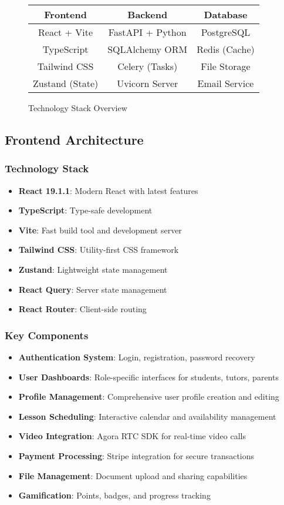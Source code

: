 \documentclass[11pt,a4paper]{article}
\begin{document}
\begin{figure}[h]
\centering
\begin{tabular}{|c|c|c|}
\hline
\textbf{Frontend} & \textbf{Backend} & \textbf{Database} \\
\hline
React + Vite & FastAPI + Python & PostgreSQL \\
TypeScript & SQLAlchemy ORM & Redis (Cache) \\
Tailwind CSS & Celery (Tasks) & File Storage \\
Zustand (State) & Uvicorn Server & Email Service \\
\hline
\end{tabular}
\caption{Technology Stack Overview}
\end{figure}

\subsection{Frontend Architecture}

\subsubsection{Technology Stack}
\begin{itemize}
    \item \textbf{React 19.1.1}: Modern React with latest features
    \item \textbf{TypeScript}: Type-safe development
    \item \textbf{Vite}: Fast build tool and development server
    \item \textbf{Tailwind CSS}: Utility-first CSS framework
    \item \textbf{Zustand}: Lightweight state management
    \item \textbf{React Query}: Server state management
    \item \textbf{React Router}: Client-side routing
\end{itemize}

\subsubsection{Key Components}
\begin{itemize}
    \item \textbf{Authentication System}: Login, registration, password recovery
    \item \textbf{User Dashboards}: Role-specific interfaces for students, tutors, parents
    \item \textbf{Profile Management}: Comprehensive user profile creation and editing
    \item \textbf{Lesson Scheduling}: Interactive calendar and availability management
    \item \textbf{Video Integration}: Agora RTC SDK for real-time video calls
    \item \textbf{Payment Processing}: Stripe integration for secure transactions
    \item \textbf{File Management}: Document upload and sharing capabilities
    \item \textbf{Gamification}: Points, badges, and progress tracking
\end{itemize}
\end{document}
